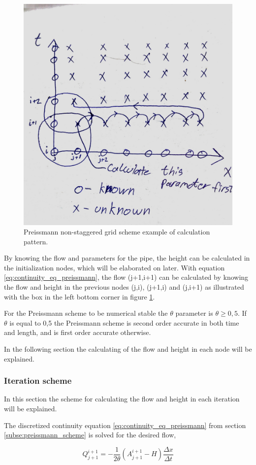 \begin{figure}[H]
\centering
\includegraphics[width=.6\textwidth]{report/simulation/pictures/preissmann_scheme_exempel}
\caption{Preissmann non-staggered grid scheme example of calculation pattern.}
\label{fig:preissmann_grid_scheme_exampel}
\end{figure} 
By knowing the flow and parameters for the pipe, the height can be calculated in the initialization nodes, which will be elaborated on later. With equation \ref{eq:continuity_eq_preissmann}, the flow (j+1,i+1) can be calculated by knowing the flow and height in the previous nodes (j,i), (j+1,i) and (j,i+1) as illustrated with the box in the left bottom corner in figure \ref{fig:preissmann_grid_scheme_exampel}.  

For the Preissmann scheme to be numerical stable the $\theta$ parameter is $\theta \geq 0,5$. If $\theta$ is equal to 0,5 the Preissmann scheme is second order accurate in both time and length, and is first order accurate otherwise.   

In the following section the calculating of the flow and height in each node will be explained.

\subsubsection*{Iteration scheme}
In this section the scheme for calculating the flow and height in each iteration will be explained. 

The discretized continuity equation \ref{eq:continuity_eq_preissmann} from section \ref{subse:preissmann_scheme} is solved for the desired flow,

\begin{equation}\label{eq:continuity_solve_flow}
	Q_{j+1}^{i+1} = - \frac{1}{2\theta}\left(A_{j+1}^{i+1}-H\right)\frac{\Delta x}{\Delta t}
\end{equation}


